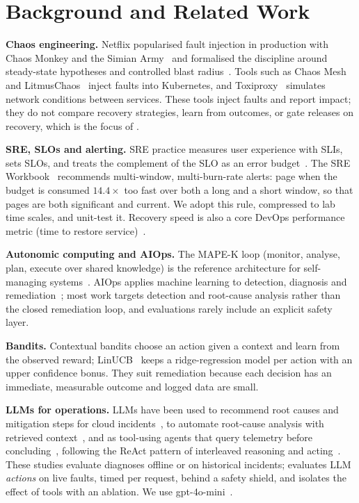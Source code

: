 \section{Background and Related Work}
\label{sec:related}
\textbf{Chaos engineering.} Netflix popularised fault injection in production with Chaos Monkey and
the Simian Army~\cite{izrailevsky2011simian} and formalised the discipline around steady-state
hypotheses and controlled blast radius~\cite{basiri2016chaos,principlesofchaos}. Tools such as
Chaos Mesh and LitmusChaos~\cite{chaosmesh,litmus} inject faults into Kubernetes, and
Toxiproxy~\cite{toxiproxy} simulates network conditions between services. These tools inject faults
and report impact; they do not compare recovery strategies, learn from outcomes, or gate releases
on recovery, which is the focus of \sys{}.

\textbf{SRE, SLOs and alerting.} SRE practice measures user experience with SLIs, sets SLOs, and
treats the complement of the SLO as an error budget~\cite{beyer2016sre}. The SRE
Workbook~\cite{beyer2018workbook} recommends multi-window, multi-burn-rate alerts: page when the
budget is consumed $14.4\times$ too fast over both a long and a short window, so that pages are
both significant and current. We adopt this rule, compressed to lab time scales, and unit-test it.
Recovery speed is also a core DevOps performance metric (time to restore service)~\cite{forsgren2018accelerate}.

\textbf{Autonomic computing and AIOps.} The MAPE-K loop (monitor, analyse, plan, execute over
shared knowledge) is the reference architecture for self-managing systems~\cite{kephart2003vision}.
AIOps applies machine learning to detection, diagnosis and remediation~\cite{dang2019aiops,
notaro2021survey}; most work targets detection and root-cause analysis rather than the closed
remediation loop, and evaluations rarely include an explicit safety layer.

\textbf{Bandits.} Contextual bandits choose an action given a context and learn from the observed
reward; LinUCB~\cite{li2010linucb} keeps a ridge-regression model per action with an upper
confidence bonus. They suit remediation because each decision has an immediate, measurable outcome
and logged data are small.

\textbf{LLMs for operations.} LLMs have been used to recommend root causes and mitigation steps for
cloud incidents~\cite{ahmed2023recommending}, to automate root-cause analysis with retrieved
context~\cite{chen2024rcacopilot}, and as tool-using agents that query telemetry before
concluding~\cite{roy2024agents}, following the ReAct pattern of interleaved reasoning and
acting~\cite{yao2023react}. These studies evaluate diagnoses offline or on historical incidents;
\sys{} evaluates LLM \emph{actions} on live faults, timed per request, behind a safety shield, and
isolates the effect of tools with an ablation. We use gpt-4o-mini~\cite{openai2024mini}.

